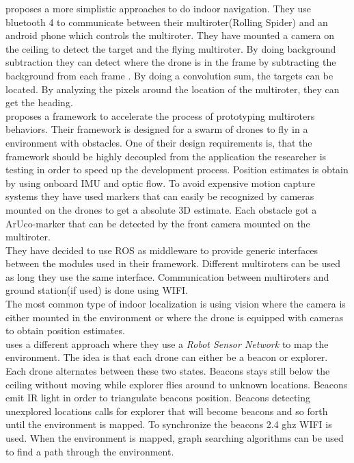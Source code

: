  
\cite{kang2015indoor} proposes a more simplistic approaches to do indoor navigation.
They use bluetooth 4 to communicate between their multiroter(Rolling Spider) and an android phone which controls the multiroter.
They have mounted a camera on the ceiling to detect the target and the flying multiroter.
By doing background subtraction they can detect where the drone is in the frame by subtracting the background from each frame \cite{wikiBackgroundsubtraction}. 
By doing a convolution sum, the targets can be located. By analyzing the pixels around the location of the multiroter, they can get the heading. \\

\cite{sanchez2014system} proposes a framework to accelerate the process of prototyping multiroters behaviors. Their framework is designed for a swarm of drones to fly in a environment with obstacles. One of their design requirements is, that the framework should be highly decoupled from the application the researcher is testing in order to speed up the development process. 
Position estimates is obtain by using onboard IMU and optic flow. To avoid expensive motion capture systems they have used markers that can easily be recognized by cameras mounted on the drones to get a absolute 3D estimate. Each obstacle got a ArUco-marker \cite{Aruco2014} that can be detected by the front camera mounted on the multiroter. \\
They have decided to use ROS as middleware to provide generic interfaces between the modules used in their framework. Different multiroters can be used as long they use the same interface. Communication between multiroters and ground station(if used) is done using WIFI. \\


The most common type of indoor localization is using vision where the camera is either mounted in the environment or where the drone is equipped with cameras to obtain position estimates.\\
\cite{stirling2012indoor} uses a different approach where they use a \textit{Robot Sensor Network} to map the environment.
The idea is that each drone can either be a beacon or explorer. Each drone alternates between these two states. Beacons stays still below the ceiling without moving while explorer flies around to unknown locations. Beacons emit IR light in order to triangulate beacons position.  Beacons detecting unexplored locations calls for explorer that will become beacons and so forth until the environment is mapped. To synchronize the beacons 2.4 ghz WIFI is used. When the environment is mapped, graph searching algorithms can be used to find a path through the environment.

